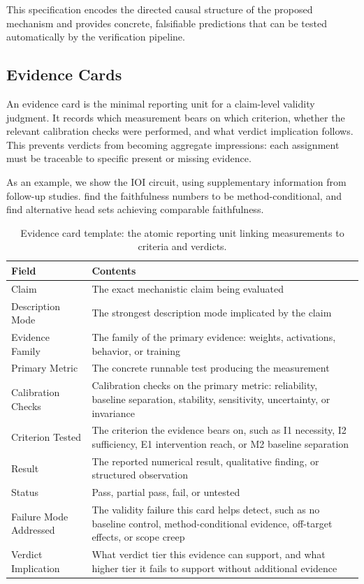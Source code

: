 \documentclass{article}
\begin{document}
This specification encodes the directed causal structure of the proposed mechanism and provides concrete, falsifiable predictions that can be tested automatically by the verification pipeline.

\subsection{Evidence Cards}

\label{appendix:evidence-cards}


An evidence card is the minimal reporting unit for a claim-level validity judgment.
It records which measurement bears on which criterion, whether the relevant
calibration checks were performed, and what verdict implication follows.
This prevents verdicts from becoming aggregate impressions: each assignment must
be traceable to specific present or missing evidence.

As an example, we show the IOI circuit, using supplementary information from follow-up studies.
\citep{miller2024transformer} find the faithfulness numbers to be method-conditional, and \citep{meloux2025everything} find alternative head sets achieving comparable faithfulness.


\begin{table}[H]
\centering
\small
\caption{Evidence card template: the atomic reporting unit linking measurements to criteria and verdicts.}
\renewcommand{\arraystretch}{1.2}
\begin{tabular}{@{}lp{10cm}@{}}
\toprule
\textbf{Field} & \textbf{Contents} \\
\midrule
Claim & The exact mechanistic claim being evaluated \\
\midrule
Description Mode & The strongest description mode implicated by the claim \\
\midrule
Evidence Family & The family of the primary evidence: weights, activations, behavior, or training \\
\midrule
Primary Metric & The concrete runnable test producing the measurement \\
\midrule
Calibration Checks & Calibration checks on the primary metric: reliability, baseline separation, stability, sensitivity, uncertainty, or invariance \\
\midrule
Criterion Tested & The criterion the evidence bears on, such as I1 necessity, I2 sufficiency, E1 intervention reach, or M2 baseline separation \\
\midrule
Result & The reported numerical result, qualitative finding, or structured observation \\
\midrule
Status & Pass, partial pass, fail, or untested \\
\midrule
Failure Mode Addressed & The validity failure this card helps detect, such as no baseline control, method-conditional evidence, off-target effects, or scope creep \\
\midrule
Verdict Implication & What verdict tier this evidence can support, and what higher tier it fails to support without additional evidence \\
\bottomrule
\end{tabular}
\label{tabevidencecardtemplate}
\end{table}
\end{document}
